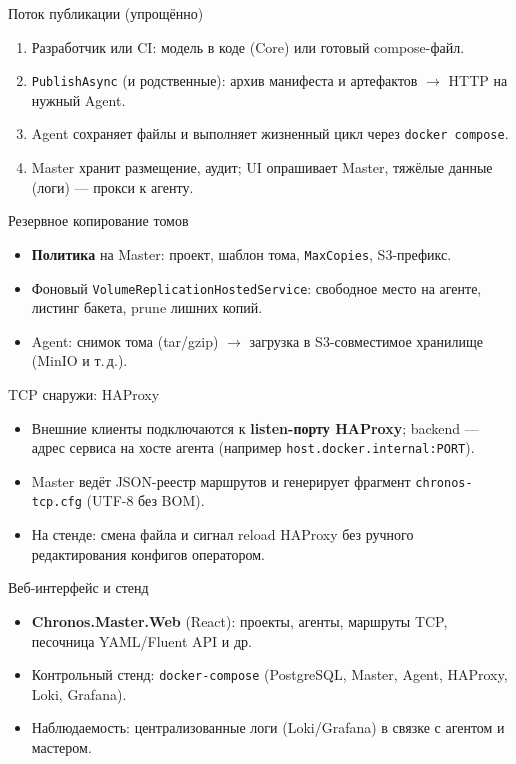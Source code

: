 \documentclass[aspectratio=169,12pt]{beamer}
\begin{document}
\begin{frame}{Поток публикации (упрощённо)}
  \begin{enumerate}
    \item Разработчик или CI: модель в коде (Core) или готовый compose-файл.
    \item \texttt{PublishAsync} (и родственные): архив манифеста и артефактов $\rightarrow$ HTTP на нужный Agent.
    \item Agent сохраняет файлы и выполняет жизненный цикл через \texttt{docker compose}.
    \item Master хранит размещение, аудит; UI опрашивает Master, тяжёлые данные (логи) — прокси к агенту.
  \end{enumerate}
\end{frame}

\begin{frame}{Резервное копирование томов}
  \begin{itemize}
    \item \textbf{Политика} на Master: проект, шаблон тома, \texttt{MaxCopies}, S3-префикс.
    \item Фоновый \texttt{VolumeReplicationHostedService}: свободное место на агенте, листинг бакета, prune лишних копий.
    \item Agent: снимок тома (tar/gzip) $\rightarrow$ загрузка в S3-совместимое хранилище (MinIO и т.\,д.).
  \end{itemize}
\end{frame}

\begin{frame}{TCP снаружи: HAProxy}
  \begin{itemize}
    \item Внешние клиенты подключаются к \textbf{listen-порту HAProxy}; backend — адрес сервиса на хосте агента (например \texttt{host.docker.internal:PORT}).
    \item Master ведёт JSON-реестр маршрутов и генерирует фрагмент \texttt{chronos-tcp.cfg} (UTF-8 без BOM).
    \item На стенде: смена файла и сигнал reload HAProxy без ручного редактирования конфигов оператором.
  \end{itemize}
\end{frame}

\begin{frame}{Веб-интерфейс и стенд}
  \begin{itemize}
    \item \textbf{Chronos.Master.Web} (React): проекты, агенты, маршруты TCP, песочница YAML/Fluent API и др.
    \item Контрольный стенд: \texttt{docker-compose} (PostgreSQL, Master, Agent, HAProxy, Loki, Grafana).
    \item Наблюдаемость: централизованные логи (Loki/Grafana) в связке с агентом и мастером.
  \end{itemize}
\end{frame}
\end{document}
